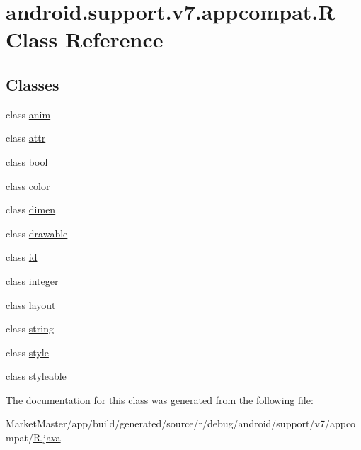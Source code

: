 \hypertarget{classandroid_1_1support_1_1v7_1_1appcompat_1_1R}{}\section{android.\+support.\+v7.\+appcompat.\+R Class Reference}
\label{classandroid_1_1support_1_1v7_1_1appcompat_1_1R}
\subsection*{Classes}
\begin{DoxyCompactItemize}
\item 
class \mbox{\hyperlink{classandroid_1_1support_1_1v7_1_1appcompat_1_1R_1_1anim}{anim}}
\item 
class \mbox{\hyperlink{classandroid_1_1support_1_1v7_1_1appcompat_1_1R_1_1attr}{attr}}
\item 
class \mbox{\hyperlink{classandroid_1_1support_1_1v7_1_1appcompat_1_1R_1_1bool}{bool}}
\item 
class \mbox{\hyperlink{classandroid_1_1support_1_1v7_1_1appcompat_1_1R_1_1color}{color}}
\item 
class \mbox{\hyperlink{classandroid_1_1support_1_1v7_1_1appcompat_1_1R_1_1dimen}{dimen}}
\item 
class \mbox{\hyperlink{classandroid_1_1support_1_1v7_1_1appcompat_1_1R_1_1drawable}{drawable}}
\item 
class \mbox{\hyperlink{classandroid_1_1support_1_1v7_1_1appcompat_1_1R_1_1id}{id}}
\item 
class \mbox{\hyperlink{classandroid_1_1support_1_1v7_1_1appcompat_1_1R_1_1integer}{integer}}
\item 
class \mbox{\hyperlink{classandroid_1_1support_1_1v7_1_1appcompat_1_1R_1_1layout}{layout}}
\item 
class \mbox{\hyperlink{classandroid_1_1support_1_1v7_1_1appcompat_1_1R_1_1string}{string}}
\item 
class \mbox{\hyperlink{classandroid_1_1support_1_1v7_1_1appcompat_1_1R_1_1style}{style}}
\item 
class \mbox{\hyperlink{classandroid_1_1support_1_1v7_1_1appcompat_1_1R_1_1styleable}{styleable}}
\end{DoxyCompactItemize}


The documentation for this class was generated from the following file\+:\begin{DoxyCompactItemize}
\item 
Market\+Master/app/build/generated/source/r/debug/android/support/v7/appcompat/\mbox{\hyperlink{debug_2android_2support_2v7_2appcompat_2R_8java}{R.\+java}}\end{DoxyCompactItemize}
